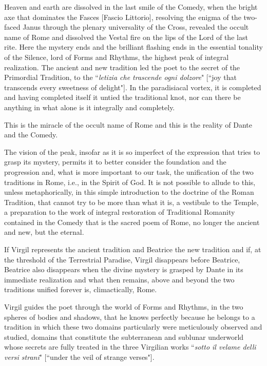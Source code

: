 Heaven and earth are dissolved in the last smile of the Comedy, when the bright axe that dominates the Fasces [Fascio Littorio], resolving the enigma of the two-faced Janus through the plenary universality of the Cross, revealed the occult name of Rome and dissolved the Vestal fire on the lips of the Lord of the last rite. Here the mystery ends and the brilliant flashing ends in the essential tonality of the Silence, lord of Forms and Rhythms, the highest peak of integral realization. The ancient and new tradition led the poet to the secret of the Primordial Tradition, to the ``\textit{letizia che trascende ogni dolzore}" [``joy that transcends every sweetness of delight"]. In the paradisiacal vortex, it is completed and having completed itself it untied the traditional knot, nor can there be anything in what alone is it integrally and completely.

This is the miracle of the occult name of Rome and this is the reality of Dante and the Comedy.

The vision of the peak, insofar as it is so imperfect of the expression that tries to grasp its mystery, permits it to better consider the foundation and the progression and, what is more important to our task, the unification of the two traditions in Rome, i.e., in the Spirit of God. It is not possible to allude to this, unless metaphorically, in this simple introduction to the doctrine of the Roman Tradition, that cannot try to be more than what it is, a vestibule to the Temple, a preparation to the work of integral restoration of Traditional Romanity contained in the Comedy that is the sacred poem of Rome, no longer the ancient and new, but the eternal.

If Virgil represents the ancient tradition and Beatrice the new tradition and if, at the threshold of the Terrestrial Paradise, Virgil disappears before Beatrice, Beatrice also disappears when the divine mystery is grasped by Dante in its immediate realization and what then remains, above and beyond the two traditions unified forever is, climactically, Rome.

Virgil guides the poet through the world of Forms and Rhythms, in the two spheres of bodies and shadows, that he knows perfectly because he belongs to a tradition in which these two domains particularly were meticulously observed and studied, domains that constitute the subterranean and sublunar underworld whose secrets are fully treated in the three Virgilian works ``\textit{sotto il velame delli versi strani}" [``under the veil of strange verses"].


